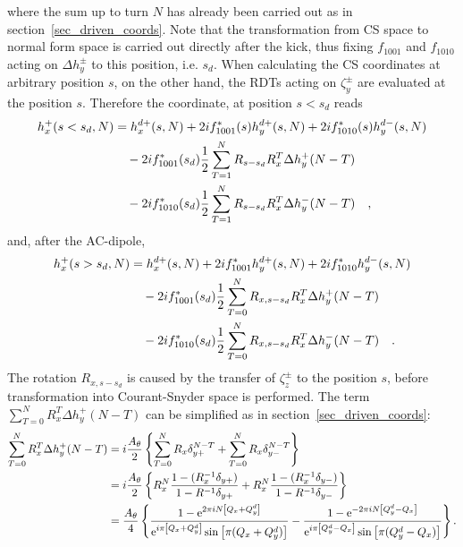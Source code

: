 %
where the sum up to turn $N$ has already been carried out as in section~\ref{sec_driven_coords}.
Note that the transformation from CS space to normal form space is carried out directly after the 
kick, thus fixing $f_{1001}$ and $f_{1010}$ acting on $\Delta h_y^\pm$ to this position, i.e. $s_d$.
When calculating the CS coordinates at arbitrary position $s$, on the other hand, the RDTs acting on
$\zeta_y^\pm$ are evaluated at the position $s$. Therefore the coordinate, at position $s<s_d$ reads
%
\begin{align}
    h_x^+(s<s_d, N) &= h_x^{d+}(s,N)
        + 2if_{1001}^*(s) h_y^{d+} (s, N)
        + 2if_{1010}^*(s) h_y^{d-} (s, N) \notag \\
        & \quad - 2if_{1001}^*(s_d) \frac{1}{2}\sum\limits_{T = 1}^N R_{s-s_d}R_x^{T}\Delta h_y^+(N-T) \notag \\
        & \quad - 2if_{1010}^*(s_d) \frac{1}{2}\sum\limits_{T = 1}^N R_{s-s_d}R_x^{T}\Delta h_y^-(N-T)
        \quad ,
        \notag \\
\end{align}
%
and, after the AC-dipole,
%
\begin{align}
    h_x^+(s>s_d, N) &= h_x^{d+}(s,N)
        + 2if_{1001}^* h_y^{d+} (s, N)
        + 2if_{1010}^* h_y^{d-} (s, N) \notag \\
        & \quad - 2if_{1001}^*(s_d) \frac{1}{2}\sum\limits_{T = 0}^N R_{x,s-s_d}R_x^{T}\Delta h_y^+(N-T) \notag \\
        & \quad - 2if_{1010}^*(s_d) \frac{1}{2}\sum\limits_{T = 0}^N R_{x,s-s_d}R_x^{T}\Delta h_y^-(N-T)
        \quad .
\end{align}
%
The rotation $R_{x,s-s_d}$ is caused by the transfer of $\zeta_z^\pm$ to the position $s$,
before transformation into Courant-Snyder space is performed. 
The term $\sum\limits_{T = 0}^N R_x^{T}\Delta h_y^+(N-T) $ can be simplified as in section~\ref{sec_driven_coords}:
%
\begin{align}
    \sum\limits_{T=0}^N R_x^T \Delta h_y^+(N-T)
        &=
        i\frac{A_\theta}{2} \left\{
            \sum\limits_{T=0}^N R_x \delta_{y+}^{N-T}
            +\sum\limits_{T=0}^N R_x \delta_{y-}^{N-T}
        \right\}
        \notag \\
        &=
        i\frac{A_\theta}{2} \left\{
            R_x^N\frac{1-(R_x^{-1}\delta_{y+})}{1-R^{-1}\delta_{y+}}
            +R_x^N\frac{1-(R_x^{-1}\delta_{y-})}{1-R^{-1}\delta_{y-}}
        \right\}
        \notag \\
        &=
        \frac{A_\theta}{4} \left\{
            \frac{1-\text{e}^{2\pi i N\left[ Q_x + Q_y^d \right]}}{\text{e}^{i\pi \left[Q_x+Q_y^d\right]}\sin\left[\pi (Q_x+Q_y^d)\right]}
            -\frac{1-\text{e}^{-2\pi i N\left[ Q_y^d - Q_x \right]}}{\text{e}^{i\pi \left[Q_y^d-Q_x\right] }\sin\left[\pi (Q_y^d-Q_x)\right]}
        \right\}
        .
\end{align}
